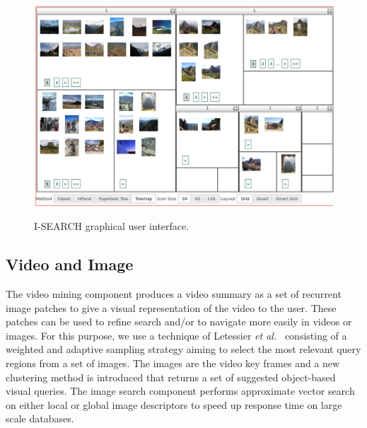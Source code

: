 \documentclass{acm_proc_article-sp}
\begin{document}
\begin{figure}
{      \includegraphics[width=0.72\columnwidth]{./resources/treemap.pdf}
      \label{fig:treemap}}      
\caption{\mbox{I-SEARCH} graphical user interface.}
\label{fig:gui}
\end{figure}

\subsection{Video and Image}
The video mining component produces a video summary as a set of recurrent image patches to give a visual representation of the video to the user.
These patches can be used to refine search and/or to navigate more easily in videos or images.
For this purpose, we use a technique of Letessier \textit{et al.}~\cite{Letessier11} consisting of a weighted and adaptive sampling strategy aiming to select the most relevant query regions from a set of images.
The images are the video key frames and a new clustering method is introduced that returns a set of suggested object-based visual queries. The image search component performs approximate vector search on either local or global image descriptors to speed up response time on large scale databases.
\end{document}
